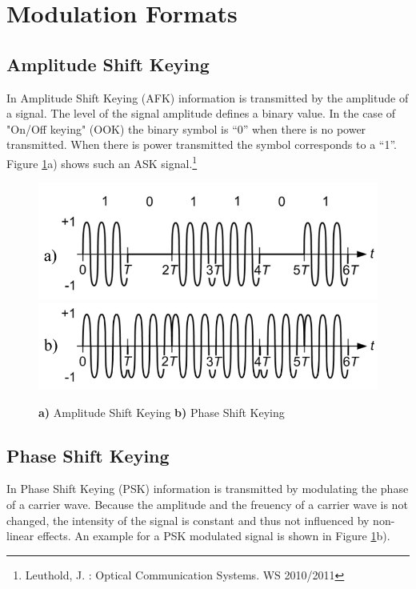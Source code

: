 \section{Modulation Formats}
% 



\subsection{Amplitude Shift Keying}
In Amplitude Shift Keying (AFK) information is transmitted by the amplitude of a signal. The level of the signal amplitude defines a binary value. In the case of "On/Off keying" (OOK) the binary symbol is "`0"' when there is no power transmitted. When there is power transmitted the symbol corresponds to a "`1"'. 
Figure \ref{fig:ask}a) shows such an ASK signal.\footnote[1]{Leuthold, J. : Optical Communication Systems. WS 2010/2011}

\begin{figure}
  \centering
  \includegraphics[width=.5\columnwidth]{Grafiken/OOK.jpg}
	\includegraphics[width=.5\columnwidth]{Grafiken/PSK.jpg}%
\caption{\textbf{a)} Amplitude Shift Keying \textbf{b)} Phase Shift Keying}
\label{fig:ask}
\end{figure}

\subsection{Phase Shift Keying}
In Phase Shift Keying (PSK) information is transmitted by modulating the phase of a carrier wave. Because the amplitude and the freuency of a carrier wave is not changed, the intensity of the signal is constant and thus not influenced by non-linear effects. An example for a PSK modulated signal is shown in Figure \ref{fig:ask}b).\footnotemark[1]

